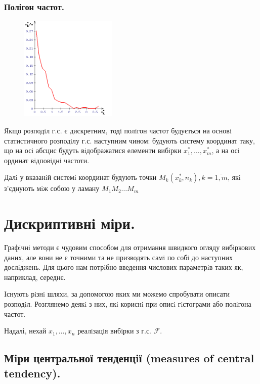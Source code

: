 \subsubsection{Полігон частот.}
\begin{figure}
\vspace*{-2em}
\centering
\includegraphics[width=0.41\textwidth]{assets/lectures_part_5-567b0078.png}
\end{figure}
Якщо розподiл г.с. є дискретним, тодi полiгон частот будується на основi статистичного
розподiлу г.с. наступним чином: будують систему координат таку, що на осi абсцис будуть вiдображатися елементи вибiрки $x_1^*, \dots , x_m^*$, а на осi ординат вiдповiднi частоти.\par Далi у вказанiй системi координат будують точки $M_k (x_k^*, n_k), k= \overline{1,m}$, якi з’єднують
мiж собою у ламану $M_1M_2\dots M_m$
\newpage
\section{Дискриптивні міри.}
Графiчнi методи є чудовим способом для отримання швидкого огляду вибiркових даних, але
вони не є точними та не призводять самi по собi до наступних дослiджень. Для цього нам
потрiбно введення числових параметрiв таких як, наприклад, середнє.\par
Iснують рiзнi шляхи, за допомогою яких ми можемо спробувати описати розподiл. Розглянемо
деякi з них, якi кориснi при описi гiстограми або полiгона частот.\par
Надалі, нехай $x_1, \dots, x_n$ реалiзацiя вибiрки з г.с. $\mathcal{F}$.

\subsection{Мiри центральної тенденцiї (measures of central tendency).}
